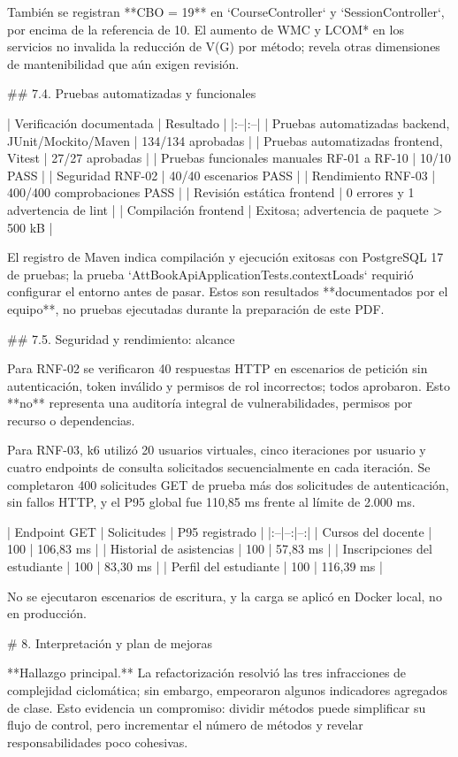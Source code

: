 También se registran **CBO = 19** en `CourseController` y `SessionController`, por encima de la referencia de 10. El aumento de WMC y LCOM* en los servicios no invalida la reducción de V(G) por método; revela otras dimensiones de mantenibilidad que aún exigen revisión.

## 7.4. Pruebas automatizadas y funcionales

| Verificación documentada | Resultado |
|:--|:--|
| Pruebas automatizadas backend, JUnit/Mockito/Maven | 134/134 aprobadas |
| Pruebas automatizadas frontend, Vitest | 27/27 aprobadas |
| Pruebas funcionales manuales RF-01 a RF-10 | 10/10 PASS |
| Seguridad RNF-02 | 40/40 escenarios PASS |
| Rendimiento RNF-03 | 400/400 comprobaciones PASS |
| Revisión estática frontend | 0 errores y 1 advertencia de lint |
| Compilación frontend | Exitosa; advertencia de paquete > 500 kB |

El registro de Maven indica compilación y ejecución exitosas con PostgreSQL 17 de pruebas; la prueba `AttBookApiApplicationTests.contextLoads` requirió configurar el entorno antes de pasar. Estos son resultados **documentados por el equipo**, no pruebas ejecutadas durante la preparación de este PDF.

## 7.5. Seguridad y rendimiento: alcance

Para RNF-02 se verificaron 40 respuestas HTTP en escenarios de petición sin autenticación, token inválido y permisos de rol incorrectos; todos aprobaron. Esto **no** representa una auditoría integral de vulnerabilidades, permisos por recurso o dependencias.

Para RNF-03, k6 utilizó 20 usuarios virtuales, cinco iteraciones por usuario y cuatro endpoints de consulta solicitados secuencialmente en cada iteración. Se completaron 400 solicitudes GET de prueba más dos solicitudes de autenticación, sin fallos HTTP, y el P95 global fue 110,85 ms frente al límite de 2.000 ms.

| Endpoint GET | Solicitudes | P95 registrado |
|:--|--:|--:|
| Cursos del docente | 100 | 106,83 ms |
| Historial de asistencias | 100 | 57,83 ms |
| Inscripciones del estudiante | 100 | 83,30 ms |
| Perfil del estudiante | 100 | 116,39 ms |

No se ejecutaron escenarios de escritura, y la carga se aplicó en Docker local, no en producción.

# 8. Interpretación y plan de mejoras

**Hallazgo principal.** La refactorización resolvió las tres infracciones de complejidad ciclomática; sin embargo, empeoraron algunos indicadores agregados de clase. Esto evidencia un compromiso: dividir métodos puede simplificar su flujo de control, pero incrementar el número de métodos y revelar responsabilidades poco cohesivas.

